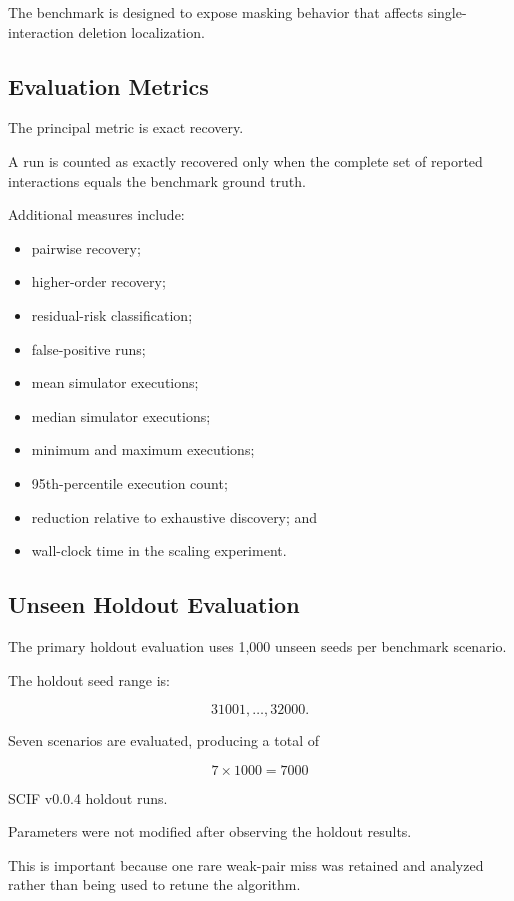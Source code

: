 The benchmark is designed to expose masking behavior that affects single-interaction deletion localization.

\subsection{Evaluation Metrics}

The principal metric is exact recovery.

A run is counted as exactly recovered only when the complete set of reported interactions equals the benchmark ground truth.

Additional measures include:

\begin{itemize}
\tightlist
\item
  pairwise recovery;
\item
  higher-order recovery;
\item
  residual-risk classification;
\item
  false-positive runs;
\item
  mean simulator executions;
\item
  median simulator executions;
\item
  minimum and maximum executions;
\item
  95th-percentile execution count;
\item
  reduction relative to exhaustive discovery; and
\item
  wall-clock time in the scaling experiment.
\end{itemize}

\subsection{Unseen Holdout Evaluation}

The primary holdout evaluation uses 1,000 unseen seeds per benchmark scenario.

The holdout seed range is:

\[
31001,\ldots,32000.
\]

Seven scenarios are evaluated, producing a total of

\[
7 \times 1000 = 7000
\]

SCIF v0.0.4 holdout runs.

Parameters were not modified after observing the holdout results.

This is important because one rare weak-pair miss was retained and analyzed rather than being used to retune the algorithm.

